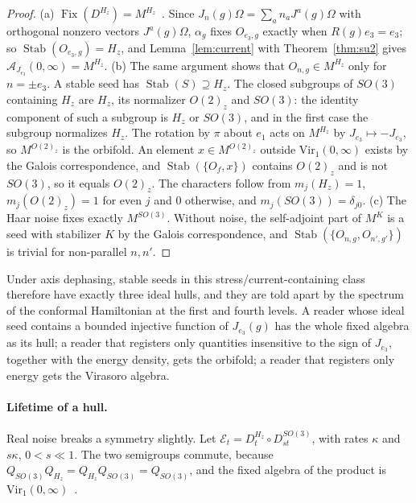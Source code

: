 \documentclass[12pt]{article}
\theoremstyle{definition}
\theoremstyle{remark}
\newcommand{\Fix}{\operatorname{Fix}}
\newcommand{\Stab}{\operatorname{Stab}}
\newcommand{\Vir}{\mathrm{Vir}}
\begin{document}
\begin{proof}
(a) \(\Fix(D^{H_z})=M^{H_z}\)~\cite{PaperI}. Since \(J_n(g)\Omega=\sum_an_aJ^a(g)\Omega\)
with orthogonal nonzero vectors \(J^a(g)\Omega\), \(\alpha_g\) fixes \(O_{e_3,g}\) exactly
when \(R(g)e_3=e_3\); so \(\Stab(O_{e_3,g})=H_z\), and Lemma~\ref{lem:current} with
Theorem~\ref{thm:su2} gives \(\mathcal A_{J_{e_3}}(0,\infty)=M^{H_z}\). (b) The same
argument shows that \(O_{n,g}\in M^{H_z}\) only for \(n=\pm e_3\). A stable seed has
\(\Stab(S)\supseteq H_z\). The closed subgroups of \(SO(3)\) containing \(H_z\) are
\(H_z\), its normalizer \(O(2)_z\) and \(SO(3)\): the identity component of such a
subgroup is \(H_z\) or \(SO(3)\), and in the first case the subgroup normalizes \(H_z\).
The rotation by \(\pi\) about \(e_1\) acts on \(M^{H_z}\) by \(J_{e_3}\mapsto-J_{e_3}\), so
\(M^{O(2)_z}\) is the orbifold. An element \(x\in M^{O(2)_z}\) outside
\(\Vir_1(0,\infty)\) exists by the Galois correspondence, and \(\Stab(\{O_f,x\})\) contains
\(O(2)_z\) and is not \(SO(3)\), so it equals \(O(2)_z\). The characters follow from
\(m_j(H_z)=1\), \(m_j(O(2)_z)=1\) for even \(j\) and \(0\) otherwise, and
\(m_j(SO(3))=\delta_{j0}\). (c) The Haar noise fixes exactly \(M^{SO(3)}\). Without
noise, the self-adjoint part of \(M^K\) is a seed with stabilizer \(K\) by the Galois correspondence, and
\(\Stab(\{O_{n,g},O_{n',g'}\})\) is trivial for non-parallel \(n,n'\).
\end{proof}

Under axis dephasing, stable seeds in this stress/current-containing
class therefore have exactly three ideal hulls, and they are
told apart by the spectrum of the conformal Hamiltonian at the first and fourth levels.
A reader whose ideal seed contains a bounded injective function of
\(J_{e_3}(g)\) has the whole fixed algebra as its hull; a reader that
registers only quantities insensitive to the sign of \(J_{e_3}\), together with the
energy density, gets the orbifold; a reader that registers only energy gets the
Virasoro algebra.

\paragraph{Lifetime of a hull.} Real noise breaks a symmetry slightly. Let
\(\mathcal E_t=D^{H_z}_t\circ D^{SO(3)}_{st}\), with rates \(\kappa\) and \(s\kappa\),
\(0<s\ll1\). The two semigroups commute, because
\(Q_{SO(3)}Q_{H_z}=Q_{H_z}Q_{SO(3)}=Q_{SO(3)}\), and the fixed algebra of the product is
\(\Vir_1(0,\infty)\)~\cite{PaperI}.
\end{document}
